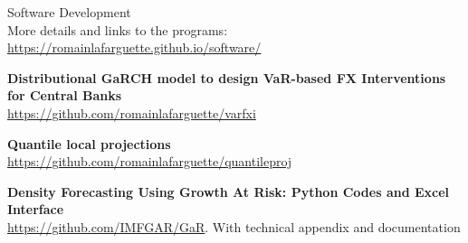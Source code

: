 \documentclass[usegeometry, 10pt, a4paper]{cv} %
\newcommand{\activite}[1]{\textbf{#1}\ }
\begin{document}
\begin{rubriquetableau}[0.95\textwidth]{Software Development}\\

More details and links to the programs: \url{https://romainlafarguette.github.io/software/}\\

\smallskip

\small
\activite{Distributional GaRCH model to design VaR-based FX Interventions for Central Banks} \\
\hspace{0.6cm} \small{\url{https://github.com/romainlafarguette/varfxi}}
\vspace{0.4cm} 

\small
\activite{Quantile local projections} \\
\hspace{0.6cm} \small{\url{https://github.com/romainlafarguette/quantileproj}}
\vspace{0.4cm} 

\small
\activite{Density Forecasting Using Growth At Risk: Python Codes and Excel Interface} \\
\hspace{0.6cm} \small{\url{https://github.com/IMFGAR/GaR}. With technical
  appendix and documentation}
\vspace{0.4cm} 
\end{rubriquetableau}
\end{document}
